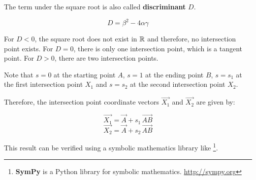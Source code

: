 The term under the square root is also called \textbf{discriminant}
\(D\).

\begin{equation}
  D = \beta^2 - 4\alpha\gamma
\end{equation}

For \(D < 0\), the square root does not exist in \(\mathbb{R}\) and
therefore, no intersection point exists. For \(D = 0\), there is only
one intersection point, which is a tangent point. For \(D > 0\), there
are two intersection points.

Note that \(s = 0\) at the starting point \(A\), \(s = 1\) at the ending
point \(B\), \(s = s_1\) at the first intersection point \(X_1\) and
\(s = s_2\) at the second intersection point \(X_2\).

Therefore, the intersection point coordinate vectors \(\vec{X_1}\) and
\(\vec{X_2}\) are given by:

\begin{equation}
  \vec{X_1} = \vec{A} + s_1 \, \vec{AB}
\end{equation}\begin{equation}
  \vec{X_2} = \vec{A} + s_2 \, \vec{AB}
\end{equation}

This result can be verified using a symbolic mathematics library like
\footnote{\textbf{SymPy} is a Python library for symbolic mathematics. \url{http://sympy.org}}.

